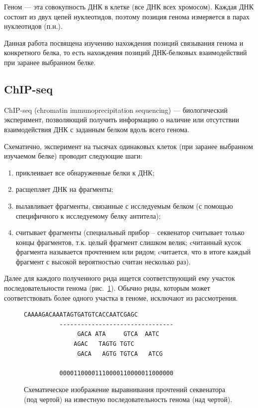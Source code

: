 \documentclass{matmex-diploma-custom}
\begin{document}
Геном --- эта совокупность ДНК в клетке (все ДНК всех хромосом).
Каждая ДНК состоит из двух цепей нуклеотидов, поэтому позиция генома измеряется в парах нуклеотидов (п.н.).

Данная работа посвящена изучению нахождения позиций связывания генома и конкретного белка, то есть нахождения позиций ДНК-белковых взаимодействий при заранее выбранном белке. 

\subsection*{ChIP-seq}
ChIP-seq (chromatin immunoprecipitation sequencing) --- биологический эксперимент, позволяющий получить информацию о наличие или отсутствии
взаимодействия ДНК с заданным белком вдоль всего генома.

Схематично, эксперимент на тысячах одинаковых клеток (при заранее выбранном изучаемом белке) проводит следующие шаги:
\begin{enumerate}
\item приклеивает все обнаруженные белки к ДНК;
\item расщепляет ДНК на фрагменты;
\item вылавливает фрагменты, связанные с исследуемым белком (с помощью специфичного к исследуемому белку антитела);
\item считывает фрагменты (специальный прибор -- секвенатор считывает только концы фрагментов, т.к. целый фрагмент слишком велик; cчитанный кусок фрагмента называется прочтением или ридом; cчитается, что в итоге каждый фрагмент с высокой вероятностью считан несколько раз).
\end{enumerate} 

Далее для каждого полученного рида ищется соответствующий
ему участок последовательности генома (рис.~\ref{fig:chip-seq}). Обычно
риды, которым может соответствовать более одного участка в геноме,
исключают из рассмотрения.

\begin{figure}[h]
  \centering

\begin{Verbatim}[commandchars=\\\{\}]
          CAAAAGACAAATAGTGATGTCACCAATCGAGC
          --------------------------------
               GACA ATA     GTCA  AATC
              AGAC   TAGTG TGTC
               GACA   AGTG TGTCA   ATCG

          00001100001110000110000011000000
\end{Verbatim}
  \caption{Схематическое изображение выравнивания прочтений секвенатора (под чертой)
    на известную последовательность генома (над чертой).}
  \label{fig:chip-seq}
\end{figure}
\end{document}
